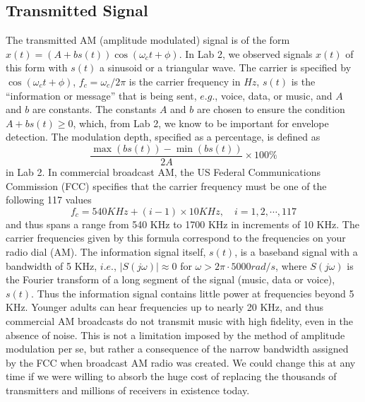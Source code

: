 \documentclass [utf8] {article}
\begin{document}
\subsection{Transmitted Signal}
{
	The transmitted AM (amplitude modulated) signal is of the form $x(t) = ( A + bs(t))\cos(\omega_ct + \phi)$. In Lab 2, we observed signals $x(t)$ of this form with $s(t)$ a sinusoid or a triangular wave. The carrier is specified by $\cos(\omega_ct + \phi)$, $f_c = \omega_c/2\pi$ is the carrier frequency in $Hz$, $s(t)$ is the “information or message” that is being sent, $e.g.$, voice, data, or music, and $A$ and $b$ are constants. The constants $A$ and $b$ are chosen to ensure the condition $A + bs(t) \ge 0$, which, from Lab 2, we know to be important for envelope detection. The modulation depth, specified as a percentage, is defined as
$$\frac{\max(bs(t))-\min(bs(t))}{2A}\times 100\%$$
in Lab 2.
In commercial broadcast AM, the US Federal Communications Commission (FCC) specifies that the carrier frequency must be one of the following 117 values
$$f_c = 540 KHz + (i-1)\times 10 KHz, \quad i = 1, 2, \cdots, 117$$
and thus spans a range from 540 KHz to 1700 KHz in increments of 10 KHz. The carrier frequencies given by this formula correspond to the frequencies on your radio dial (AM).
The information signal itself, $s(t)$, is a baseband signal with a bandwidth of 5 KHz, $i.e.$, $| S(j\omega) | \approx 0$ for $\omega > 2\pi \cdot 5000 rad/s$, where $S(j\omega)$ is the Fourier transform of a long segment of the signal (music, data or voice), $s(t)$. Thus the information signal contains little power at frequencies beyond 5 KHz. Younger adults can hear frequencies up to nearly 20 KHz, and thus commercial AM broadcasts do not transmit music with high fidelity, even in the absence of noise. This is not a limitation imposed by the method of amplitude modulation per se, but rather a consequence of the narrow bandwidth assigned by the FCC when broadcast AM radio was created. We could change this at any time if we were willing to absorb the huge cost of replacing the thousands of transmitters and millions of receivers in existence today.
}
\end{document}
